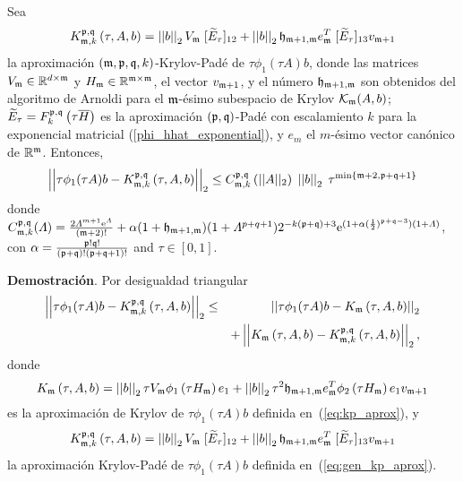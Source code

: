 \begin{theorem}\cite{naranjo2021locally}\label{theorem:Krylov-bound}
	Sea 
	\begin{equation} \label{eq:gen_kp_aprox}
	K_{\mathfrak{m},k}^{\mathfrak{p},\mathfrak{q}}\left(\tau, A , b \right)=\left\lvert \left\lvert b \right\rvert \right\rvert_2 V_{\mathfrak{m}}\;[\widetilde{E}_{\tau}]_{12} + \left\lvert \left\lvert b \right\rvert \right\rvert_2 \mathfrak{h}_{\mathfrak{m}+1,\mathfrak{m}}e_{\mathfrak{m}}^T\;[\widetilde{E}_{\tau}]_{13} v_{\mathfrak{m}+1}
	\end{equation}
	la aproximación $(\mathfrak{m} , \mathfrak{p} ,\mathfrak{q} , k)$-Krylov-Padé de $\tau \phi_1(\tau A)b$, donde las matrices $V_{\mathfrak{m}}\in\mathbb{R}^{d\times \mathfrak{m}}$ y $H_{\mathfrak{m}}\in\mathbb{R}^{{\mathfrak{m}} \times {\mathfrak{m}}}$, el vector $v_{\mathfrak{m}+1}$, y el número $\mathfrak{h}_{\mathfrak{m}+1,\mathfrak{m}}$ son obtenidos del algoritmo de Arnoldi para el $\mathfrak{m}$-ésimo subespacio de Krylov $\mathcal{K}_{\mathfrak{m}}(A,b)$;  $\widetilde{E}_{\tau}=F_k^{\mathfrak{p},\mathfrak{q}}\left(\tau\overline{H}\right)$ es la aproximación $(\mathfrak{p},\mathfrak{q})$-Padé con escalamiento $k$ para la exponencial matricial (\ref{phi_hhat_exponential}), y $e_m$ el $m$-ésimo vector canónico de $\mathbb{R}^{\mathfrak{m}}$.
	Entonces,
	\begin{equation}
	\left\lvert\left\lvert  \tau \phi_1(\tau A)b -
	K_{\mf,k}^{\pf,\qf}\left( \tau, A , b \right)\right\rvert\right\rvert_2%
	\leq C_{\mf,k}^{\pf,\qf}\left(\lvert\lvert A \rvert\rvert_2\right) \;
	\nnorm{\nnorm{b}}_2 \; \tau^{\mathrm{min}\left\{ \mf+2,\pf+\qf+1 \right\}}
	\end{equation}
	donde $C_{\mathfrak{m},k}^{\mathfrak{p},\mathfrak{q}}(\varLambda)= \frac{2 \varLambda^{m+1} \mathrm{e}^{\varLambda}}{(\mathfrak{m}+2)!}+
	\alpha (1+\mathfrak{h}_{\mathfrak{m}+1,\mathfrak{m}}) (1+\varLambda^{p+q+1}) 2^{-k(\mathfrak{p}+\mathfrak{q})+3}\mathrm{e}^{(1+\alpha(\frac{1}{2})^{\mathfrak{p}+\mathfrak{q}-3})(1+\varLambda)} $,
	con $\alpha=\frac{\mathfrak{p}!\mathfrak{q}!}{(\mathfrak{p}+\mathfrak{q})!(\mathfrak{p}+\mathfrak{q}+1)!}$ and $\tau \in [0,1]$.
\end{theorem}
\textbf{Demostración}. Por desigualdad triangular
\begin{eqnarray} \label{importatdeq}
\left\lvert\left\lvert  \tau \phi_1(\tau A)b -
K_{\mathfrak{m},k}^{\mathfrak{p},\mathfrak{q}}\left( \tau , A , b \right)\right\rvert\right\rvert_2
& \leq & \left\lvert\left\lvert \tau \phi_1(\tau A)b -  K_{\mathfrak{m}}\left( \tau , A , b \right) \right\rvert\right\rvert_2 \\
& & + \left\lvert\left\lvert  K_{\mathfrak{m}}\left( \tau , A , b \right) -
K_{\mathfrak{m},k}^{\mathfrak{p},\mathfrak{q}}\left( \tau, A , b \right)\right\rvert\right\rvert_2, \nonumber
\end{eqnarray}
donde
\begin{equation*}
K_{\mathfrak{m}}\left(\tau,A , b \right)=\left\lvert \left\lvert b \right\rvert \right\rvert_2 \tau V_{\mathfrak{m}}\phi_1\left( \tau H_{\mathfrak{m}} \right) e_1 + \left\lvert \left\lvert b \right\rvert \right\rvert_2 \tau^{2}\mathfrak{h}_{\mathfrak{m}+1,\mathfrak{m}}e_{\mathfrak{m}}^T\phi_2\left(\tau H_{\mathfrak{m}}\right) e_1 v_{\mathfrak{m}+1}
\end{equation*}
es la aproximación de Krylov de $\tau \phi_1(\tau A)b$ definida en~(\ref{eq:kp_aprox}), y
\begin{equation*}
K_{\mathfrak{m},k}^{\mathfrak{p},\mathfrak{q}}\left(\tau, A , b \right)=\left\lvert \left\lvert b \right\rvert \right\rvert_2 V_{\mathfrak{m}}\;[\widetilde{E}_{\tau}]_{12} + \left\lvert \left\lvert b \right\rvert \right\rvert_2 \mathfrak{h}_{\mathfrak{m}+1,\mathfrak{m}}e_{\mathfrak{m}}^T\;[\widetilde{E}_{\tau}]_{13} v_{\mathfrak{m}+1}
\end{equation*}
la aproximación Krylov-Padé de $\tau \phi_1(\tau A)b$ definida en~(\ref{eq:gen_kp_aprox}).


